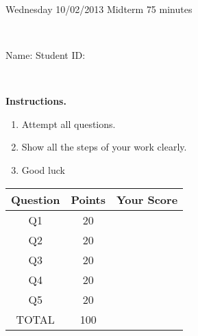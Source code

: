 \documentclass[12pt, oneside]{amsart}
\newcommand{\one}{20}
\newcommand{\two}{20}
\newcommand{\three}{20}
\newcommand{\four}{20}
\newcommand{\five}{20}
\begin{document}
%

\begin{center}
    \hrulefill\\
    {\bf \textsf{\raisebox{-0.10cm}{Fall 2013: MATH 280} \hspace{\fill} 
            \raisebox{-0.10cm}{Numerical Analysis} \hspace{\fill}
            \raisebox{-0.10cm}{David Karapetyan}}}\\
    \hrulefill\\
    {\large \rule{0cm}{1.2cm} \textsf{Wednesday 10/02/2013} \hfill
        \textsf{Midterm} \hfill  \textsf{75 minutes}}\\
    {\large\rule{0cm}{1.2cm}\textsf{Name: \framebox[2.9in]{\rule{0cm}{0.8cm}} 
            \hspace{\fill}
            Student ID: \framebox[2.1in]{\rule{0cm}{0.8cm}}}}\\
\end{center}
\vspace{0.8cm}

\noindent
{\bf \textsf{Instructions.}}

\begin{enumerate}
    \item Attempt all questions.   
    \item Show all the steps of your work clearly.  
    \item Good luck 
\end{enumerate}

\vfill


\begin{center}
    {\large
        \begin{tabular}{|c|c|c|}
            \hline
            \rule[-0.3cm]{0cm}{1cm}
            \textsf{Question} & \textsf{Points} &  \textsf{Your Score} \\
            \hline
            \hline
            \rule[-0.3cm]{0cm}{1cm}
            \textsf{Q1} & \one &\\
            \hline
            \rule[-0.3cm]{0cm}{1cm}
            \textsf{Q2} & \two &\\
            \hline
            \rule[-0.3cm]{0cm}{1cm}
            \textsf{Q3} & \three &\\
            \hline
            \rule[-0.3cm]{0cm}{1cm}
            \textsf{Q4} & \four &\\
            \hline
            \rule[-0.3cm]{0cm}{1cm}
            \textsf{Q5} & \five &\\
            \hline
            \rule[-0.3cm]{0cm}{1cm}

            \textsf{TOTAL} & 100 & \\
            \hline
        \end{tabular}
    } 

\end{center}
\end{document}

